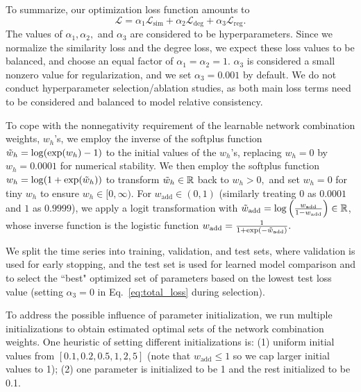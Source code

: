 \documentclass{article}
\theoremstyle{plain}
\theoremstyle{definition}
\theoremstyle{remark}
\begin{document}
To summarize, our optimization loss function amounts to
\begin{equation}
    \label{eq:total_loss}
    \mathcal{L}=\alpha_1\mathcal{L}_\text{sim} + \alpha_2\mathcal{L}_\text{deg} + \alpha_3\mathcal{L}_\text{reg}.
\end{equation}
The values of $\alpha_1, \alpha_2,$ and $\alpha_3$ are considered to be hyperparameters. Since we normalize the similarity loss and the degree loss, we expect these loss values to be balanced, and choose an equal factor of $\alpha_1=\alpha_2=1$.  $\alpha_3$ is considered a small nonzero value for regularization, and we set $\alpha_3=0.001$ by default. We do not conduct hyperparameter selection/ablation studies, as both main loss terms need to be considered and balanced to model relative consistency.

To cope with the nonnegativity requirement of the learnable network combination weights, $w_h$'s, we employ the inverse of the softplus function $\Tilde{w}_h=\log(\exp(w_h)-1)$ to the initial values of the $w_h$'s, replacing $w_h=0$ by $w_h=0.0001$ for numerical stability. We then employ the softplus function $w_h=\log(1+\exp(\Tilde{w}_h))$ to transform $\Tilde{w}_h\in\mathbb{R}$ back to $w_h>0,$ and set $w_h=0$ for tiny $w_h$ to ensure $w_h\in[0, \infty)$. For $w_\text{add}\in(0, 1)$ (similarly treating $0$ as $0.0001$ and $1$ as $0.9999$), we apply a logit transformation with $\Tilde{w}_\text{add}=\log\left(\frac{w_\text{add}}{1-w_\text{add}}\right)\in\mathbb{R}$, whose inverse function is the logistic function $w_\text{add}=\frac{1}{1+\exp(-\Tilde{w}_\text{add})}.$

We split the time series into training, validation, and test sets, where validation is used for early stopping, and the test set is used for learned model comparison and to select the ``best" optimized set of parameters based on the lowest test loss value (setting $\alpha_3=0$ in Eq.~\eqref{eq:total_loss} during selection).

To address the possible influence of parameter initialization, we run multiple initializations to obtain estimated optimal sets of the network combination weights. One heuristic of setting different initializations is: (1) uniform initial values from $[0.1, 0.2, 0.5, 1, 2, 5]$ (note that $w_\text{add}\leq1$ so we cap larger initial values to 1); (2) one parameter is initialized to be 1 and the rest initialized to be 0.1.
\end{document}
